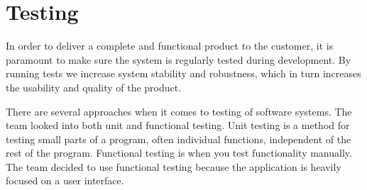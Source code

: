 \chapter{Testing}
\label{sec:testing}
In order to deliver a complete and functional product to the customer, it is paramount to make sure the system is regularly tested during development. 
By running tests we increase system stability and robustness, which in turn increases the usability and quality of the product. 

There are several approaches when it comes to testing of software systems. The team looked into both \gls{unit} and functional testing. Unit testing is a method for testing small parts of a program, often individual functions, independent of the rest of the program. Functional testing is when you test functionality manually. The team decided to use functional testing because the application is heavily focused on a user interface.

\newpage


